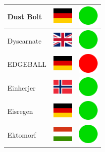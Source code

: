 \documentclass[12pt, a4paper, twoside]{report}
\begin{document}
\begin{center}
\begin{longtable}{|p{5cm}|p{2cm}|p{2cm}|}
Dust Bolt & \includegraphics[width=1cm]{4x3/de} & \includegraphics[width=1cm]{likes/y} \\ \hline
Dyscarnate & \includegraphics[width=1cm]{4x3/gb} & \includegraphics[width=1cm]{likes/y} \\ \hline
EDGEBALL & \includegraphics[width=1cm]{4x3/de} & \includegraphics[width=1cm]{likes/n} \\ \hline
Einherjer & \includegraphics[width=1cm]{4x3/no} & \includegraphics[width=1cm]{likes/y} \\ \hline
Eisregen & \includegraphics[width=1cm]{4x3/de} & \includegraphics[width=1cm]{likes/y} \\ \hline
Ektomorf & \includegraphics[width=1cm]{4x3/hu} & \includegraphics[width=1cm]{likes/y} \\ \hline

\end{longtable}
\end{center}
\end{document}
